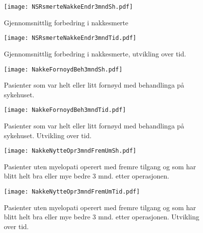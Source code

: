 \documentclass[presentation,xcolor=pdftex,dvipsnames,table]{beamer}\usepackage[]{graphicx}\usepackage[]{color}
\begin{document}
\begin{tiny}
\begin{frame}[fragile]
\begin{figure}[ht]
\centering
\texttt{[image: NSRsmerteNakkeEndr3mndSh.pdf]}
\caption{Gjennomsnittlig forbedring i nakkesmerte}
\end{figure}
\end{frame}

\begin{frame}[fragile]
\begin{figure}[ht]
\centering
\texttt{[image: NSRsmerteNakkeEndr3mndTid.pdf]}
\caption{Gjennomsnittlig forbedring i nakkesmerte, utvikling over tid.}
\end{figure}
\end{frame}

\begin{frame}[fragile]
\begin{figure}[ht]
\centering
\texttt{[image: NakkeFornoydBeh3mndSh.pdf]}
\caption{Pasienter som var helt eller litt fornøyd med behandlinga på sykehuset. }
\end{figure}
\end{frame}

\begin{frame}[fragile]
\begin{figure}[ht]
\centering
\texttt{[image: NakkeFornoydBeh3mndTid.pdf]}
\caption{Pasienter som var helt eller litt fornøyd med behandlinga på sykehuset. Utvikling over tid. }
\end{figure}
\end{frame}


\begin{frame}[fragile]
\begin{figure}[ht]
\centering
\texttt{[image: NakkeNytteOpr3mndFremUmSh.pdf]}
\caption{Pasienter uten myelopati operert med fremre tilgang og som har blitt helt bra eller mye bedre 3 mnd. etter operasjonen. }
\end{figure}
\end{frame}

\begin{frame}[fragile]
\begin{figure}[ht]
\centering
\texttt{[image: NakkeNytteOpr3mndFremUmTid.pdf]}
\caption{Pasienter uten myelopati operert med fremre tilgang og som har blitt helt bra eller mye bedre 3 mnd. etter operasjonen. Utvikling over tid. }
\end{figure}
\end{frame}


\end{tiny}
\end{document}
